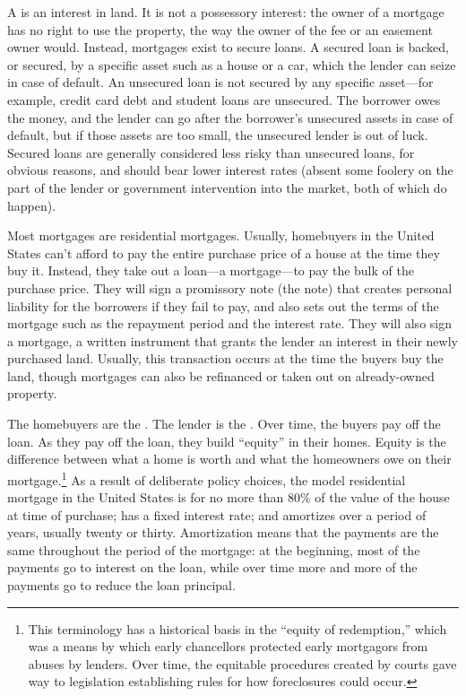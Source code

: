 A  is an interest in land.  It is not a possessory interest: the
owner
of a mortgage has no right to use the property, the way the owner of the fee or
an easement owner would.  Instead, mortgages exist to secure loans.  A secured
loan is backed, or secured, by a specific asset such as a house or a car, which
the lender can seize in case of default.  An unsecured loan is not secured by
any specific asset---for example, credit card debt and student loans are
unsecured.  The borrower owes the money, and the lender can go after the
borrower's unsecured assets in case of default, but if those assets are too
small, the unsecured lender is out of luck.  Secured loans are generally
considered less risky than unsecured loans, for obvious reasons, and should
bear lower interest rates (absent some foolery on the part of the lender or
government intervention into the market, both of which do happen).  

Most mortgages are residential mortgages.  Usually, homebuyers in the United
States can't afford to pay the entire purchase price of a house at the time they
buy it. Instead, they take out a loan---a mortgage---to pay the bulk of the
purchase price.  They will sign a promissory note (the note) that creates
personal liability for the borrowers if they fail to pay, and also sets out the
terms of the mortgage such as the repayment period and the interest rate.  They
will also sign a mortgage, a written instrument that grants the lender an
interest in their newly purchased land.  Usually, this transaction occurs at the
time the buyers buy the land, though mortgages can also be refinanced or taken
out on already-owned property.

The homebuyers are the .  The lender is the
.  Over time, the buyers pay off the loan.  As they pay off
the loan, they build ``equity'' in their homes.  Equity is the difference
between what a home is worth and what the homeowners owe on their
mortgage.\footnote{This terminology has a historical basis in the ``equity of
redemption,'' which was a means by which early chancellors protected early
mortgagors from abuses by lenders.  Over time, the equitable procedures created
by courts gave way to legislation establishing rules for how foreclosures could
occur.}  As a result of deliberate policy choices, the model residential
mortgage in the United States is for no more than 80\% of the value of the house
at time of purchase; has a fixed interest rate; and amortizes over a period of
years, usually twenty or thirty.  Amortization means that the payments are the
same throughout the period of the mortgage: at the beginning, most of the
payments go to interest on the loan, while over time more and more of the
payments go to reduce the loan principal.  

